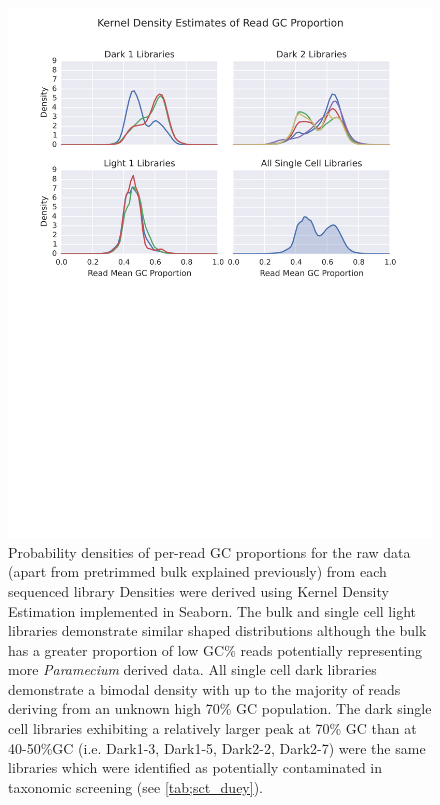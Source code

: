 \begin{figure}[h]
    \includegraphics[width=\textwidth]{lib_gc_prop.svg}
    \caption{Probability densities of per-read GC proportions for the raw data (apart from pretrimmed bulk explained previously)
        from each sequenced library 
        Densities were derived using Kernel Density Estimation implemented in Seaborn. 
        The bulk and single cell light libraries demonstrate similar shaped distributions
        although the bulk has a greater proportion of low GC\% reads potentially representing
        more \textit{Paramecium} derived data. All single cell dark libraries 
        demonstrate a bimodal density with up to the majority of reads deriving 
        from an unknown high 70\% GC population. The dark single cell libraries
        exhibiting a relatively larger peak at 70\% GC than at 40-50\%GC (i.e.
        Dark1-3, Dark1-5, Dark2-2, Dark2-7) were
        the same libraries which were identified as potentially contaminated
        in taxonomic screening (see \ref{tab;sct_duey}).
    }
    \label{fig:gc_prop_raw}
\end{figure}

